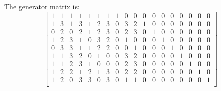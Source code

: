 The generator matrix is:
$$
\left[
\begin{array}{*{18}{c}}
1 & 1 & 1 & 1 & 1 & 1 & 1 & 1 & 0 & 0 & 0 & 0 & 0 & 0 & 0 & 0 & 0 & 0\\
1 & 3 & 1 & 3 & 1 & 2 & 3 & 0 & 3 & 2 & 1 & 0 & 0 & 0 & 0 & 0 & 0 & 0\\
0 & 2 & 0 & 2 & 1 & 2 & 3 & 0 & 2 & 3 & 0 & 1 & 0 & 0 & 0 & 0 & 0 & 0\\
1 & 2 & 3 & 1 & 0 & 3 & 2 & 0 & 1 & 0 & 0 & 0 & 1 & 0 & 0 & 0 & 0 & 0\\
0 & 3 & 3 & 1 & 1 & 2 & 2 & 0 & 0 & 1 & 0 & 0 & 0 & 1 & 0 & 0 & 0 & 0\\
1 & 1 & 3 & 2 & 0 & 1 & 0 & 0 & 3 & 2 & 0 & 0 & 0 & 0 & 1 & 0 & 0 & 0\\
1 & 1 & 2 & 3 & 1 & 0 & 0 & 0 & 2 & 3 & 0 & 0 & 0 & 0 & 0 & 1 & 0 & 0\\
1 & 2 & 2 & 1 & 2 & 1 & 3 & 0 & 2 & 2 & 0 & 0 & 0 & 0 & 0 & 0 & 1 & 0\\
1 & 2 & 0 & 3 & 3 & 0 & 3 & 0 & 1 & 1 & 0 & 0 & 0 & 0 & 0 & 0 & 0 & 1\\
\end{array}
\right]
$$
